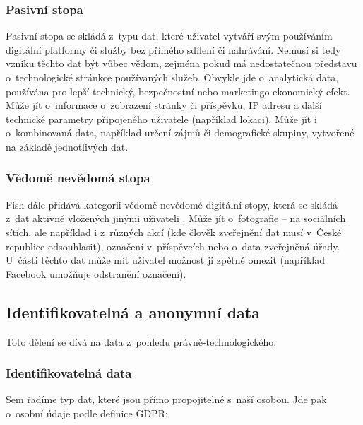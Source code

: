 \subsubsection*{Pasivní stopa}

Pasivní stopa se skládá z~typu dat, které uživatel vytváří svým používáním digitální platformy či služby bez přímého sdílení či nahrávání. Nemusí si tedy vzniku těchto dat být vůbec vědom, zejména pokud má nedostatečnou představu o~technologické stránkce používaných služeb. Obvykle jde o~analytická data, používána pro lepší technický, bezpečnostní nebo marketingo-ekonomický efekt. Může jít o~informace o~zobrazení stránky či příspěvku, IP adresu a další technické parametry připojeného uživatele (například lokaci). Může jít i o~kombinovaná data, například určení zájmů či demografické skupiny, vytvořené na základě jednotlivých dat.

\subsubsection*{Vědomě nevědomá stopa}

Fish dále přidává kategorii vědomě nevědomé digitální stopy, která se skládá z~dat aktivně vložených jinými uživateli \citep{fish-digital-footprint}.
Může jít o~fotografie -- na sociálních sítích, ale například i z~různých akcí (kde člověk zveřejnění dat musí v~České republice odsouhlasit), označení v~příspěvcích nebo o~data zveřejněná úřady. U~části těchto dat může mít uživatel možnost ji zpětně omezit (například Facebook umožňuje odstranění označení).

\subsection{Identifikovatelná a anonymní data}
Toto dělení se dívá na data z~pohledu právně-technologického.

\subsubsection*{Identifikovatelná data}

Sem řadíme typ dat, které jsou přímo propojitelné s~naší osobou. Jde pak o~osobní údaje podle definice GDPR:

\begin{displayquote}
	\citep{gdpr}
\end{displayquote}

